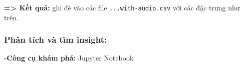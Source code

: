 \textbf{=> Kết quả:} ghi đè vào các file \texttt{...with-audio.csv} với các đặc trưng như trên.




\clearpage

















































\subsubsection{Phân tích và tìm insight:}
\begin{flushleft}
    

   
\textbf{-Công cụ khám phá: } Jupyter Notebook
\\

 
\end{flushleft}






